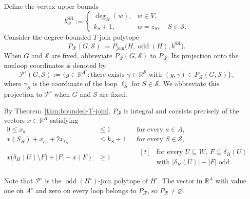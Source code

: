 \documentclass[11pt]{amsart}
\DeclareMathOperator{\odd}{odd}
\newcommand{\1}{\mathbbm{1}}
\begin{document}
Define the vertex upper bounds
\begin{equation}
\label{eq:framework-2-demands}
    b^{\mathrm{SR}}_w:=
    \begin{cases}
        \deg_H(w),&w\in V,\\[3pt]
        k_S+1,&w=z_S,\quad S\in\mathcal S.
    \end{cases}
\end{equation}
Consider the degree-bounded $T$-join polytope
\[
    {P_{\mathcal R}}(G,\mathcal S):=
    P_{\mathrm{join}}\bigl(H,\odd(H),b^{\mathrm{SR}}\bigr).
\]
When $G$ and $\mathcal S$ are fixed, abbreviate
${P_{\mathcal R}}(G,\mathcal S)$ to ${P_{\mathcal R}}$.
Its projection onto the nonloop coordinates is denoted by
\[
 {\mathcal P^\circ}(G,\mathcal S)
 :=\{y\in\mathbb R^{A^\circ}:\text{there exists }
       \gamma\in\mathbb R^{\mathcal S}
       \text{ with }(y,\gamma)\in{P_{\mathcal R}}(G,\mathcal S)\},
\]
where $\gamma_S$ is the coordinate of the loop $\ell_S$ for $S\in \mathcal S$.
We abbreviate this projection to ${\mathcal P^\circ}$ when
$G$ and $\mathcal S$ are fixed.

By Theorem~\ref{thm:bounded-T-join}, ${P_{\mathcal R}}$ is integral
and consists precisely of the vectors $x\in\mathbb R^A$ satisfying
\begin{equation}
\label{eq:framework-2-polytope}
\begin{aligned}
 0\le x_a&\le1
 &&\text{for every }a\in A,\\[3pt]
 x(S_H)+x_{c_S}+2x_{\ell_S}&\le k_S+1
 &&\text{for every }S\in\mathcal S,\\[3pt]
 x\bigl(\delta_H(U)\setminus F\bigr)+|F|-x(F)&\ge1
 &&\begin{aligned}[t]
   &\text{for every }U\subseteq W,\ F\subseteq\delta_H(U)\\
   &\text{with }|\delta_H(U)|+|F|\text{ odd}.
 \end{aligned}
\end{aligned}
\end{equation}



{Note that $\mathcal P^\circ$ is the
$\odd(H^\circ)$-join polytope of $H^\circ$.
The vector in $\mathbb R^A$ with value one on $A^\circ$
and zero on every loop belongs to $P_{\mathcal R}$, so
$P_{\mathcal R}\ne\varnothing$.}
\end{document}
